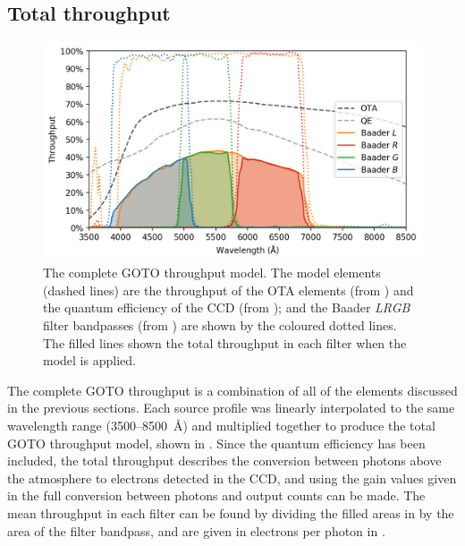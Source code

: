 
\subsection{Total throughput}
\label{sec:total_throughput}
\begin{colsection}

\begin{figure}[t]
    \begin{center}
        \includegraphics[width=\linewidth]{images/throughput/throughput.png}
    \end{center}
    \caption[Complete throughput model for the GOTO filters]{
        The complete GOTO throughput model. The model elements (dashed lines) are the throughput of the OTA elements (from ) and the quantum efficiency of the CCD (from ); and the Baader \textit{LRGB} filter bandpasses (from ) are shown by the coloured dotted lines. The filled lines shown the total throughput in each filter when the model is applied.
    }\label{fig:throughput}
\end{figure}

The complete GOTO throughput is a combination of all of the elements discussed in the previous sections. Each source profile was linearly interpolated to the same wavelength range (3500--\SI{8500}{\angstrom}) and multiplied together to produce the total GOTO throughput model, shown in . Since the quantum efficiency has been included, the total throughput describes the conversion between photons above the atmosphere to electrons detected in the CCD, and using the gain values given in  the full conversion between photons and output counts can be made. The mean throughput in each filter can be found by dividing the filled areas in  by the area of the filter bandpass, and are given in electrons per photon in .

\newpage

\end{colsection}

